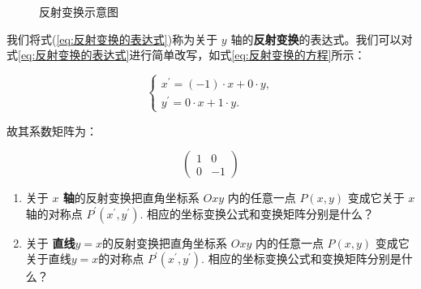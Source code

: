 \begin{figure}[h]
\centering
{}
\caption{反射变换示意图\label{fig:反射变换}}
\end{figure}

我们将式(\ref{eq:反射变换的表达式})称为关于 $y$ 轴的\textcolor{third}{\bf 反射变换}的表达式。我们可以对式\ref{eq:反射变换的表达式}进行简单改写，如式\ref{eq:反射变换的方程}所示：

\begin{equation}
\left\{\begin{array}{l}
x^{\prime}= (-1) \cdot x + 0\cdot y, \\
y^{\prime}= 0\cdot x + 1 \cdot y .
\end{array}\right.
\label{eq:反射变换的方程}
\end{equation}

故其系数矩阵为：

\begin{equation}
\left(\begin{array}{rr}
1  & 0 \\
0  & -1
\end{array}\right)
\label{eq:反射变换示例矩阵}
\end{equation}


\vspace{0.5cm}

\begin{exercise}
\begin{enumerate}
    \item 关于 \textbf{$x$ 轴}的反射变换把直角坐标系 $O x y$ 内的任意一点 $P(x, y)$ 变成它关于 $x$ 轴的对称点 $P^{\prime}\left(x^{\prime}, y^{\prime}\right)$. 相应的坐标变换公式和变换矩阵分别是什么？
    \item 关于 \textbf{直线$y=x$}的反射变换把直角坐标系 $O x y$ 内的任意一点 $P(x, y)$ 变成它关于直线$y=x$的对称点 $P^{\prime}\left(x^{\prime}, y^{\prime}\right)$. 相应的坐标变换公式和变换矩阵分别是什么？
\end{enumerate}
\end{exercise}

